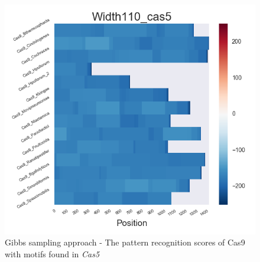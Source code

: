 \documentclass[11pt, oneside]{article}
\begin{document}
\begin{figure}[htbp]
\begin{minipage}{0.32\textwidth}
  \end{minipage}
  \hfill
  \begin{minipage}{0.32\textwidth}
    \centering
    \includegraphics[width=1\textwidth]{images/Width110_cas5_heatmap} %
  \end{minipage}
  \caption{Gibbs sampling approach - The pattern recognition scores of Cas9 with motifs found in \textit{Cas5}}
  \label{fig:cas5_recog}
\end{figure}
\end{document}
